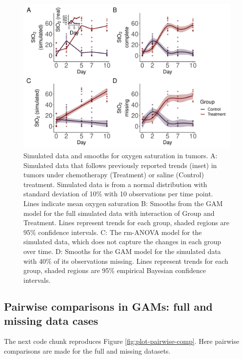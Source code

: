 \documentclass[
]{article}
\begin{document}
\begin{figure}[H]

{\centering \includegraphics[width=0.75\linewidth,]{00-Full_document_files/figure-latex/sim-smooth-plot-Appendix-1} 

}

\caption{Simulated data and smooths for oxygen saturation in tumors. A: Simulated data that follows previously reported trends (inset) in tumors under chemotherapy (Treatment) or saline (Control) treatment. Simulated data is from a normal distribution with standard deviation of 10\% with 10 observations per time point. Lines indicate mean oxygen saturation B: Smooths from the GAM model for the full simulated data with interaction of Group and Treatment. Lines represent trends for each group, shaded regions are 95\% confidence intervals. C: The rm-ANOVA model for the simulated data, which does not capture the changes in each group over time. D: Smooths for the GAM model for the simulated data with 40\% of its observations missing. Lines represent trends for each group, shaded regions are 95\% empirical Bayesian confidence intervals.}\label{fig:sim-smooth-plot-Appendix}
\end{figure}

\hypertarget{pairwise-comparisons-in-gams-full-and-missing-data-cases}{%
\subsection{Pairwise comparisons in GAMs: full and missing data cases}\label{pairwise-comparisons-in-gams-full-and-missing-data-cases}}

The next code chunk reproduces Figure \ref{fig:plot-pairwise-comp}. Here pairwise comparisons are made for the full and missing datasets.
\end{document}
